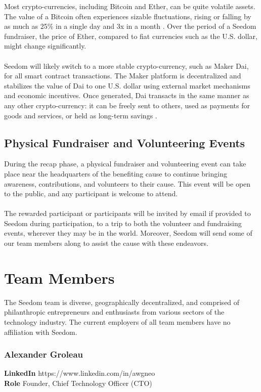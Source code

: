 \documentclass[11pt]{article}
\begin{document}
Most crypto-currencies, including Bitcoin and Ether, can be quite volatile assets. The value of a Bitcoin often experiences sizable fluctuations, rising or falling by as much as 25\% in a single day and 3x in a month \cite{10}. Over the period of a Seedom fundraiser, the price of Ether, compared to fiat currencies such as the U.S. dollar, might change significantly.\\\\
Seedom will likely switch to a more stable crypto-currency, such as Maker Dai, for all smart contract transactions. The Maker platform is decentralized and stabilizes the value of Dai to one U.S. dollar using external market mechanisms and economic incentives. Once generated, Dai transacts in the same manner as any other crypto-currency: it can be freely sent to others, used as payments for goods and services, or held as long-term savings \cite{9}. 

\subsection{Physical Fundraiser and Volunteering Events}

During the recap phase, a physical fundraiser and volunteering event can take place near the headquarters of the benefiting cause to continue bringing awareness, contributions, and volunteers to their cause. This event will be open to the public, and any participant is welcome to attend.\\\\
The rewarded participant or participants will be invited by email if provided to Seedom during participation, to a trip to both the volunteer and fundraising events, wherever they may be in the world. Moreover, Seedom will send some of our team members along to assist the cause with these endeavors.

\section{Team Members}

The Seedom team is diverse, geographically decentralized, and comprised of philanthropic entrepreneurs and enthusiasts from various sectors of the technology industry. The current employers of all team members have no affiliation with Seedom.

\subsubsection{Alexander Groleau}
\begin{minipage}{\textwidth}
\textbf{LinkedIn} https://www.linkedin.com/in/awgneo\\
\textbf{Role} Founder, Chief Technology Officer (CTO)\\
\end{minipage}
\end{document}
